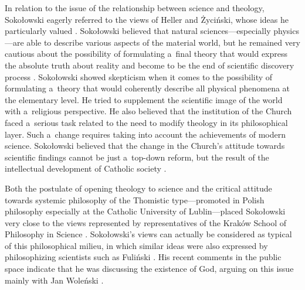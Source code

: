 \documentclass[%
  manuscript=article,
  year=2024,
  volume=77,
  doi=00000.000,
]{zfn}
\begin{document}
In relation to the issue of the relationship between science and theology, Sokołowski eagerly referred to the views of Heller and Życiński, whose ideas he particularly valued 
\parencites[see,][]{Sokoowski1993Koscio}[][p.187]{Sokoowski2014Czy}. %
 Sokołowski believed that natural sciences---especially physics---are able to describe various aspects of the material world, but he remained very cautious about the possibility of formulating a~final theory that would express the absolute truth about reality and become to be the end of scientific discovery process 
\parencite[][]{Sokoowski2011O}. %
 Sokołowski showed skepticism when it comes to the possibility of formulating a~theory that would coherently describe all physical phenomena at the elementary level. He tried to supplement the scientific image of the world with a~religious perspective. He also believed that the institution of the Church faced a~serious task related to the need to modify theology in its philosophical layer. Such a~change requires taking into account the achievements of modern science. Sokołowski believed that the change in the Church's attitude towards scientific findings cannot be just a~top-down reform, but the result of the intellectual development of Catholic society 
\parencite[][p.123]{Sokoowski1993Koscio}.%




Both the postulate of opening theology to science and the critical attitude towards systemic philosophy of the Thomistic type---promoted in Polish philosophy especially at the Catholic University of Lublin---placed Sokołowski very close to the views represented by representatives of the Kraków School of Philosophy in Science 
\parencites[see e.g.,][pp.228–229]{Trombik2021Koncepcje}[][]{Trombik2022Teologia}. %
 Sokołowski's views can actually be considered as typical of this philosophical milieu, in which similar ideas were also expressed by philosophizing scientists such as Fuliński 
\parencite[][]{Trombik2023Andrzej}. %
 His recent comments in the public space indicate that he was discussing the existence of God, arguing on this issue mainly with Jan Woleński 
\parencite[][]{Sokoowski2024Polscy}.%
\end{document}
